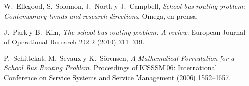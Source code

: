 \documentclass[11pt, a4paper]{article}
\begin{document}
\begin{thebibliography}{99}
W.~Ellegood, S.~Solomon, J.~North y J.~Campbell, \emph{School bus routing problem: Contemporary trends and research directions}. Omega, en prensa.

J.~Park y B.~Kim, \emph{The school bus routing problem: A review}. European Journal of Operational Research 202-2 (2010) 311--319.

P.~Schittekat, M.~Sevaux y K.~S\"orensen, \emph{A Mathematical Formulation for a School Bus Routing Problem}. Proceedings of ICSSSM'06: International Conference on Service Systems and Service Management (2006) 1552--1557.
\end{thebibliography}
\end{document}
